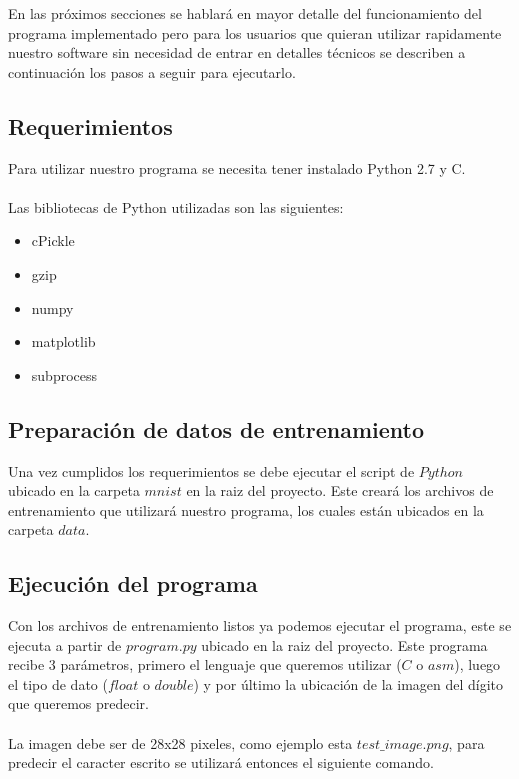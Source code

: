 
En las próximos secciones se hablará en mayor detalle del funcionamiento del programa implementado pero para los usuarios que quieran utilizar rapidamente nuestro software sin necesidad de entrar en detalles técnicos se describen a continuación los pasos a seguir para ejecutarlo.

\subsection{Requerimientos}

Para utilizar nuestro programa se necesita tener instalado Python 2.7 y C.
\\
\\
Las bibliotecas de Python utilizadas son las siguientes:

\begin{itemize}

\item cPickle
\item gzip
\item numpy
\item matplotlib
\item subprocess

\end{itemize}

\subsection{Preparación de datos de entrenamiento}

Una vez cumplidos los requerimientos se debe ejecutar el script de $Python$ ubicado en la carpeta $mnist$ en la raiz del proyecto. Este creará los archivos de entrenamiento que utilizará nuestro programa, los cuales están ubicados en la carpeta $data$.

\subsection{Ejecución del programa}

Con los archivos de entrenamiento listos ya podemos ejecutar el programa, este se ejecuta a partir de $program.py$ ubicado en la raiz del proyecto. Este programa recibe 3 parámetros, primero el lenguaje que queremos utilizar ($C$ o $asm$), luego el tipo de dato ($float$ o $double$) y por último la ubicación de la imagen del dígito que queremos predecir.
\\
\\
La imagen debe ser de 28x28 pixeles, como ejemplo esta $test\_image.png$, para predecir el caracter escrito se utilizará entonces el siguiente comando.

